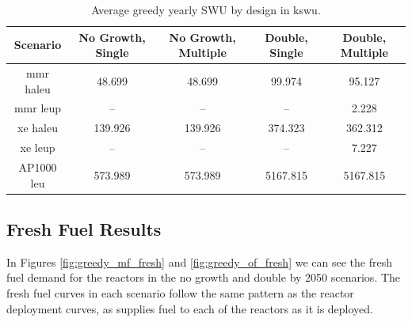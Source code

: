 \begin{table}[H]
  \centering
  \caption{Average greedy yearly SWU by design in k\gls{swu}.}
  \label{tab:greedy_swu_avg}
  \begin{tabular}{c c c c c}
     \hline
     Scenario & No Growth, Single & No Growth, Multiple & Double, Single & Double, Multiple  \\
     \hline
     \gls{mmr} \gls{haleu}   & 48.699  & 48.699  & 99.974   & 95.127   \\
     \gls{mmr} \gls{leup}    & --      & --      & --       & 2.228    \\
     \gls{xe} \gls{haleu}    & 139.926 & 139.926 & 374.323  & 362.312  \\
     \gls{xe} \gls{leup}     & --      & --      & --       & 7.227    \\
     AP1000 \gls{leu}        & 573.989 & 573.989 & 5167.815 & 5167.815 \\
     \hline
  \end{tabular}
\end{table}



\subsection{Fresh Fuel Results}
\label{sec:greedy_fresh}

In Figures \ref{fig:greedy_mf_fresh} and \ref{fig:greedy_of_fresh} we can see the fresh fuel demand for the reactors in the no growth and double by 2050 scenarios. The fresh fuel curves in each scenario follow the same pattern as the reactor deployment curves, as \cyclus supplies fuel to each of the reactors as it is deployed.


